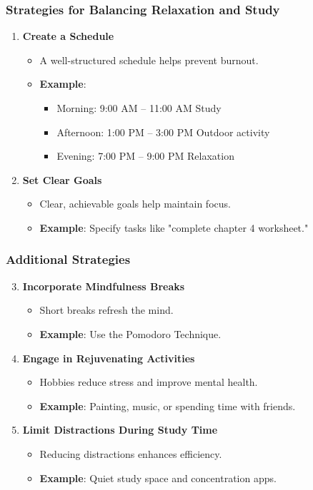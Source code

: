 \documentclass[aspectratio=169]{beamer}
\begin{document}
\begin{frame}[fragile]
    \frametitle{Strategies for Balancing Relaxation and Study}
    \begin{enumerate}
        \item \textbf{Create a Schedule}
            \begin{itemize}
                \item A well-structured schedule helps prevent burnout.
                \item \textbf{Example}: 
                \begin{itemize}
                    \item Morning: 9:00 AM – 11:00 AM Study
                    \item Afternoon: 1:00 PM – 3:00 PM Outdoor activity
                    \item Evening: 7:00 PM – 9:00 PM Relaxation
                \end{itemize}
            \end{itemize}
        \item \textbf{Set Clear Goals}
            \begin{itemize}
                \item Clear, achievable goals help maintain focus.
                \item \textbf{Example}: Specify tasks like "complete chapter 4 worksheet."
            \end{itemize}
    \end{enumerate}
\end{frame}

\begin{frame}[fragile]
    \frametitle{Additional Strategies}
    \begin{enumerate}
        \setcounter{enumi}{2}
        \item \textbf{Incorporate Mindfulness Breaks}
            \begin{itemize}
                \item Short breaks refresh the mind.
                \item \textbf{Example}: Use the Pomodoro Technique.
            \end{itemize}
        \item \textbf{Engage in Rejuvenating Activities}
            \begin{itemize}
                \item Hobbies reduce stress and improve mental health.
                \item \textbf{Example}: Painting, music, or spending time with friends.
            \end{itemize}
        \item \textbf{Limit Distractions During Study Time}
            \begin{itemize}
                \item Reducing distractions enhances efficiency.
                \item \textbf{Example}: Quiet study space and concentration apps.
            \end{itemize}
    \end{enumerate}
\end{frame}
\end{document}
